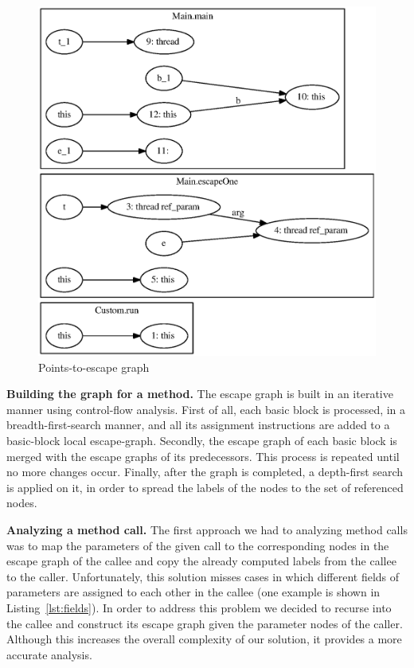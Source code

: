 \documentclass[letterpaper]{article}
\newcommand{\mypar}[1]{{\bf #1.}}
\begin{document}
\begin{figure} \center
 \includegraphics[width=0.8\linewidth]{EscapeTest.eps}
  \caption{Points-to-escape graph}
  \label{fig:escapegraph}
\end{figure}

\mypar{Building the graph for a method} The escape graph is built in an iterative manner using control-flow analysis.
First of all, each basic block is processed, in a breadth-first-search manner, and all its assignment instructions are added to a
basic-block local escape-graph.
Secondly, the escape graph of each basic block is merged with the escape graphs of its predecessors. This process
is repeated until no more changes occur. Finally, after the graph is completed, a depth-first search is applied on it,
in order to spread the labels of the nodes to the set of referenced nodes.

\mypar{Analyzing a method call} The first approach we had to analyzing method calls was to map the parameters of the given
call to the corresponding nodes in the escape graph of the callee and copy the already computed labels from the callee to the
caller. Unfortunately, this solution misses cases in which different fields of parameters are assigned to each other in the callee
(one example is shown in Listing~\ref{lst:fields}). In order to address this problem we decided to recurse into the callee and
construct its escape graph given the parameter nodes of the caller. Although this increases the overall complexity of our solution,
it provides a more accurate analysis.
\end{document}
